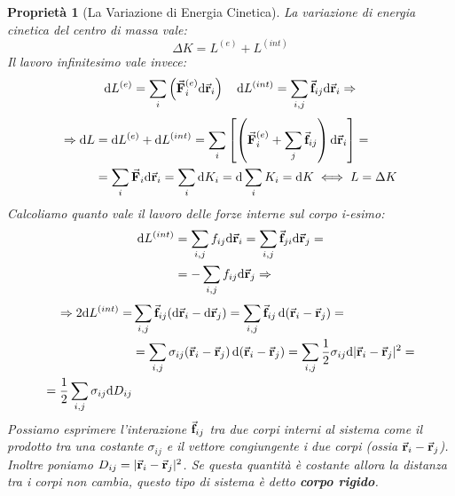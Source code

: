 \documentclass{article}
\newtheorem{property}{Proprietà}[section]
\newcommand{\note}{\noindent {\quad \bf \underline{Osservazione:}} \quad}
\newcommand{\then}{\ensuremath{\Rightarrow}}
\renewcommand{\r}{\va{r}}
\newcommand{\F}{\va{F}}
\newcommand{\f}{\va{f}}
\begin{document}
\begin{property}[La Variazione di Energia Cinetica]
La variazione di energia cinetica del centro di massa vale:
\[\Delta K=L^{(e)}+L^{(int)}\]
Il lavoro infinitesimo vale invece:
\begin{equation}
    \dd L^{(e)}=\sum_i\left(\F_i^{(e)}\dd\r_i\right)\quad\dd L^{(int)}=\sum_{i,j}\f_{ij}\dd\r_i\then
\end{equation}
\begin{equation}
\begin{split}
    \then\dd L&=\dd L^{(e)}+\dd L^{(int)}=\sum_i\left[\left(\F_i^{(e)}+\sum_j\f_{ij}\right)\dd\r_i\right]=\\
    &=\sum_i\F_i\dd\r_i=\sum_i\dd K_i=\dd\sum_iK_i=\dd K\iff L=\Delta K
\end{split}
\end{equation}
Calcoliamo quanto vale il lavoro delle forze interne sul corpo i-esimo:
\begin{equation}
\begin{split}
    \dd L^{(int)}&=\sum_{i,j}f_{ij}\dd\r_i=\sum_{i,j}\f_{ji}\dd\r_j=\\
    &=-\sum_{i,j}f_{ij}\dd\r_j\then 
\end{split}
\end{equation}
\begin{equation}
\begin{split}
    \then 2\dd L^{(int)}=&\sum_{i,j}\f_{ij}(\dd\r_i-\dd\r_j)=\sum_{i,j}\f_{ij}\dd(\r_i-\r_j)=\\
    &=\sum_{i,j}\sigma_{ij}(\r_i-\r_j)\dd(\r_i-\r_j)=\sum_{i,j}\frac{1}{2}\sigma_{ij}\dd|\r_i-\r_j|^2=\\
    =\frac{1}{2}\sum_{i,j}\sigma_{ij}\dd D_{ij}
\end{split}    
\end{equation}
\note Possiamo esprimere l'interazione $\f_{ij}$ tra due corpi interni al sistema come il prodotto tra una costante $\sigma_{ij}$ e il vettore congiungente i due corpi (ossia $\r_i-\r_j$). Inoltre poniamo $D_{ij}=|\r_i-\r_j|^2$. Se questa quantità è costante allora la distanza tra i corpi non cambia, questo tipo di sistema è detto \textbf{corpo rigido}.
\end{property}
\end{document}
